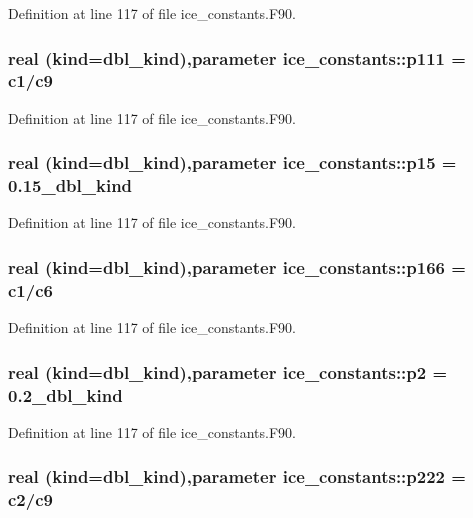 Definition at line 117 of file ice\_\-constants.F90.\hypertarget{namespaceice__constants_a8bd880bb5783b5dc60e535b9fc37c3e7}{
\subsubsection[{p111}]{\setlength{\rightskip}{0pt plus 5cm}real (kind=dbl\_\-kind),parameter {\bf ice\_\-constants::p111} = {\bf c1}/{\bf c9}}}
\label{namespaceice__constants_a8bd880bb5783b5dc60e535b9fc37c3e7}


Definition at line 117 of file ice\_\-constants.F90.\hypertarget{namespaceice__constants_a8312dd00bbc8aad76e555bff87f11f47}{
\subsubsection[{p15}]{\setlength{\rightskip}{0pt plus 5cm}real (kind=dbl\_\-kind),parameter {\bf ice\_\-constants::p15} = 0.15\_\-dbl\_\-kind}}
\label{namespaceice__constants_a8312dd00bbc8aad76e555bff87f11f47}


Definition at line 117 of file ice\_\-constants.F90.\hypertarget{namespaceice__constants_ab9c8c51bf25c869a87c12048d123a2c6}{
\subsubsection[{p166}]{\setlength{\rightskip}{0pt plus 5cm}real (kind=dbl\_\-kind),parameter {\bf ice\_\-constants::p166} = {\bf c1}/{\bf c6}}}
\label{namespaceice__constants_ab9c8c51bf25c869a87c12048d123a2c6}


Definition at line 117 of file ice\_\-constants.F90.\hypertarget{namespaceice__constants_a14e6139c0f7bfd47c5fed3e88620be22}{
\subsubsection[{p2}]{\setlength{\rightskip}{0pt plus 5cm}real (kind=dbl\_\-kind),parameter {\bf ice\_\-constants::p2} = 0.2\_\-dbl\_\-kind}}
\label{namespaceice__constants_a14e6139c0f7bfd47c5fed3e88620be22}


Definition at line 117 of file ice\_\-constants.F90.\hypertarget{namespaceice__constants_af98444617c032204077b878268b3dbd8}{
\subsubsection[{p222}]{\setlength{\rightskip}{0pt plus 5cm}real (kind=dbl\_\-kind),parameter {\bf ice\_\-constants::p222} = {\bf c2}/{\bf c9}}}
\label{namespaceice__constants_af98444617c032204077b878268b3dbd8}


